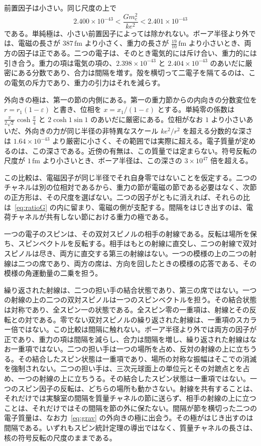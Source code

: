 \documentclass[a4paper]{article}
\begin{document}
前置因子は小さい。同じ尺度の上で
\begin{equation}
\label{eq:ratioG}
2.400\times 10^{-43}<\frac{G m_e^{2}}{k e^{2}}<2.401\times 10^{-43}
\end{equation}
である。単純極は、小さい前置因子によっては除かれない。ボーア半径より外では、電磁の長さが \(387\,\mathrm{fm}\) より小さく、重力の長さが \(\tfrac{19}{10}\,\mathrm{fm}\) より小さいとき、両方の因子は正である。二つの電子は、そのとき電気的には斥け合い、重力的には引き合う。重力の項は電気の項の、\(2.398\times 10^{-43}\) と \(2.404\times 10^{-43}\) のあいだに厳密にある分数であり、合力は間隔を増す。殻を横切って二電子を隔てるのは、この電気の斥力であり、重力の引力はそれを減らす。

外向きの極は、第一の節の内側にある。第一の重力節からの内向きの分数変位を \(r=r_1(1-\varepsilon)\) と書き、位相を \(x=x_1/(1-\varepsilon)\) とする。単純零の係数は \(\frac{\pi}{2\sqrt{2}}\cosh\frac{\pi}{4}\) と \(2\cosh 1\sin 1\) のあいだに厳密にある。位相がなお \(1\) より小さいあいだ、外向きの力が同じ半径の非特異なスケール \(k e^{2}/r^{2}\) を超える分数的な深さは \(1.64\times 10^{-43}\) より厳密に小さく、その範囲では実際に超える。電子質量が定めるのは、この深さである。近傍の有無は、この質量では定まらない。符号反転の尺度が \(1\,\mathrm{fm}\) より小さいとき、ボーア半径は、この深さの \(3\times 10^{47}\) 倍を超える。

この比較は、電磁因子が同じ半径でそれ自身零ではないことを仮定する。二つのチャネルは別の位相対であるから、重力の節が電磁の節である必要はなく、次節の正方形は、その尺度を選ばない。二つの因子がともに消えれば、それらの比は~\eqref{eq:ratioG} の内に留まり、電磁の側が支配する。間隔をはじき出すのは、電荷チャネルが共有しない節における重力の極である。

一つの電子のスピンは、その双対スピノルの相手の射線である。反転は場所を保ち、スピンベクトルを反転する。相手はもとの射線に直交し、二つの射線で双対スピノルは尽き、両方に直交する第三の射線はない。一つの模様の上の二つの射線は二つの席であり、両方の席は、方向を回したときの模様の応答である、その模様の角運動量の二乗を担う。

繰り返された射線は、二つの担い手の結合状態であり、第三の席ではない。一つの射線の上の二つの双対スピノルは一つのスピンベクトルを担う。その結合状態は対称であり、全スピン一の状態である。全スピン零の一重項は、射線とその反転との対である。零でない双対スピノルの繰り返された射線は、一重項のスカラー倍ではない。この比較は間隔に触れない。ボーア半径より外では両方の因子が正であり、重力の項は間隔を減らし、合力は間隔を増し、繰り返された射線はなお一重項ではない。二つの担い手は一つの場所を占め、反対の射線の上に立ちうる。その結合したスピン状態は一重項であり、場所の対称な振幅はそこでの消滅を強制されない。二つの担い手は、三次元球面上の単位元とその対蹠点とを占め、一つの射線の上に立ちうる。その結合したスピン状態は一重項ではない。一つのスピン因子の反転は、どちらの場所も動かさない。射線を共有することは、それだけでは実験室の間隔を質量チャネルの節に送らず、相手の射線の上に立つことは、それだけではその間隔を節の外に保たない。間隔が節を横切った二つの電子質量は、なお力~\eqref{eq:grav} の外向きの極に出会う。その極がはじき出すのは間隔である。いずれもスピン統計定理の導出ではなく、質量チャネルの長さは、核の符号反転の尺度のままである。
\end{document}
